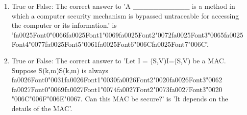 \documentclass[12pt]{article}
\begin{document}
\begin{enumerate}[label=\arabic*.]
\item True or False: The correct answer to 'A \_\_\_\_\_\_\_\_\_\_\_ is a method in which a computer security mechanism is bypassed untraceable for accessing the computer or its information.' is '{\csname fa0025Font0\endcsname\char"0066}{\csname fa0025Font1\endcsname\char"0069}{\csname fa0025Font2\endcsname\char"0072}{\csname fa0025Font3\endcsname\char"0065}{\csname fa0025Font4\endcsname\char"0077}{\csname fa0025Font5\endcsname\char"0061}{\csname fa0025Font6\endcsname\char"006C}{\csname fa0025Font7\endcsname\char"006C}'.
\item True or False: The correct answer to 'Let I = (S,V)I=(S,V) be a MAC. Suppose S(k,m)S(k,m) is always {\csname fa0026Font0\endcsname\char"0031}{\csname fa0026Font1\endcsname\char"0030}{\csname fa0026Font2\endcsname\char"0020}{\csname fa0026Font3\endcsname\char"0062} {\csname fa0027Font0\endcsname\char"0069}{\csname fa0027Font1\endcsname\char"0074}{\csname fa0027Font2\endcsname\char"0073}{\csname fa0027Font3\endcsname\char"0020} {\char"006C}{\char"006F}{\char"006E}{\char"0067}. Can this MAC be secure?' is 'It depends on the details of the MAC'.
\end{enumerate}
\end{document}
